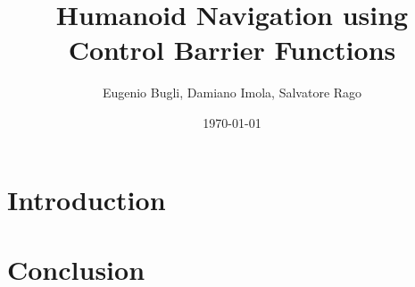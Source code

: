 \documentclass[12pt]{article}
\title{Humanoid Navigation using Control Barrier Functions}
\author{Eugenio Bugli, Damiano Imola, Salvatore Rago}
\date{\today} %
\begin{document}
\maketitle
\tableofcontents
\section{Introduction} 

\section{Conclusion} 
\end{document}

